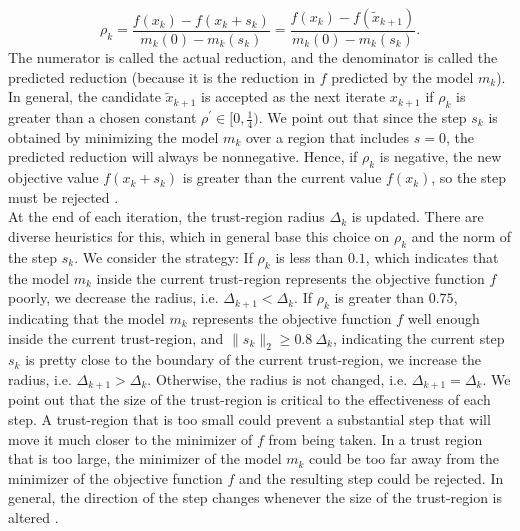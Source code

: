 \begin{equation}\label{agreement}
    \rho_k = \frac{f(x_k) - f(x_k + s_k)}{m_k(0) - m_k(s_k)} = \frac{f(x_k) - f(\widetilde{x}_{k+1})}{m_k(0) - m_k(s_k)}.
\end{equation}
The numerator is called the actual reduction, and the denominator is called the predicted reduction (because it is the reduction in $f$ predicted by the model $m_k$). \\
In general, the candidate $\widetilde{x}_{k+1}$ is accepted as the next iterate $x_{k+1}$ if $\rho_k$ is greater than a chosen constant $\rho^{\prime} \in [0 , \frac{1}{4})$. We point out that since the step $s_k$ is obtained by minimizing the model $m_k$ over a region that includes $s = 0$, the predicted reduction will always be nonnegative. Hence, if $\rho_k$ is negative, the new objective value $f(x_k + s_k)$ is greater than the current value $f(x_k)$, so the step must be rejected \cite[p.~68-69]{NocedalWright:2006}. \\
At the end of each iteration, the trust-region radius $\Delta_k$ is updated. There are diverse heuristics for this, which in general base this choice on $\rho_k$ and the norm of the step $s_k$. We consider the strategy: If $\rho_k$ is less than $0.1$, which indicates that the model $m_k$ inside the current trust-region represents the objective function $f$ poorly, we decrease the radius, i.e. $\Delta_{k+1} < \Delta_k$. If $\rho_k$ is greater than $0.75$, indicating that the model $m_k$ represents the objective function $f$ well enough inside the current trust-region, and $\lVert s_k \rVert_2 \geq 0.8 \ \Delta_k$, indicating the current step $s_k$ is pretty close to the boundary of the current trust-region, we increase the radius, i.e. $\Delta_{k+1} > \Delta_k$. Otherwise, the radius is not changed, i.e. $\Delta_{k+1} = \Delta_k$. We point out that the size of the trust-region is critical to the effectiveness of each step. A trust-region that is too small could prevent a substantial step that will move it much closer to the minimizer of $f$ from being taken. In a trust region that is too large, the minimizer of the model $m_k$ could be too far away from the minimizer of the objective function $f$ and the resulting step could be rejected. In general, the direction of the step changes whenever the size of the trust-region is altered \cite[p.~67]{NocedalWright:2006}. \\

\newpage

